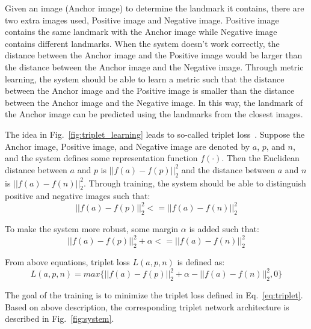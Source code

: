 \documentclass[final,3p]{elsarticle}
\begin{document}
Given an image (Anchor image) to determine the landmark it contains, there are two extra images used,  Positive image and Negative image. Positive image contains the same landmark with the Anchor image while Negative image contains different landmarks. When the system doesn't work correctly, the distance between the Anchor image and the Positive image would be larger than the distance between the Anchor image and the Negative image. Through metric learning, the system should be able to learn a metric such that the distance between the Anchor image and the Positive image is smaller than the distance between the Anchor image and the Negative image. In this way, the landmark of the Anchor image can be predicted using the landmarks from the closest images.

The idea in Fig.~\ref{fig:triplet_learning} leads to so-called triplet loss~\cite{schroff2015facenet}. Suppose the Anchor image, Positive image, and Negative image are denoted by $a$, $p$, and $n$, and the system defines some representation function $f(\cdot)$. Then the Euclidean distance between $a$ and $p$ is $||f(a) - f(p)||^2_2$ and the distance between $a$ and $n$ is $||f(a) - f(n)||^2_2$. Through training, the system should be able to distinguish positive and negative images such that:
\begin{equation}
||f(a) - f(p)||^2_2 <= ||f(a) - f(n)||^2_2
\end{equation}

To make the system more robust, some margin $\alpha$ is added such that:
\begin{equation}
||f(a) - f(p)||^2_2 + \alpha <= ||f(a) - f(n)||^2_2
\end{equation}

From above equations, triplet loss $L(a, p, n)$ is defined as:
\begin{equation}
L(a, p, n) = max\{||f(a) - f(p)||^2_2 + \alpha - ||f(a) - f(n)||^2_2, 0\}
\label{eq:triplet}
\end{equation}

The goal of the training is to minimize the triplet loss defined in Eq.~\ref{eq:triplet}. Based on above description, the corresponding triplet network architecture is described in Fig.~\ref{fig:system}.
\end{document}
